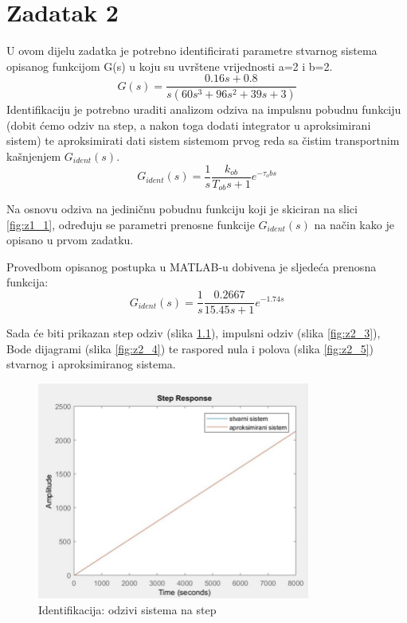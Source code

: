\chapter{Zadatak 2}

U ovom dijelu zadatka je potrebno identificirati parametre stvarnog sistema opisanog funkcijom G(s) u koju su uvrštene vrijednosti a=2 i b=2.
	\[G(s)=\frac{0.16s+0.8}{s(60s^3+96s^2+39s+3)}\]
Identifikaciju je potrebno uraditi analizom odziva na impulsnu pobudnu funkciju (dobit ćemo odziv na step, a nakon toga dodati integrator u aproksimirani sistem) te aproksimirati dati sistem sistemom prvog reda sa čistim transportnim kašnjenjem $G_{ident} (s)$.
	\[G_{ident} (s)=\frac{1}{s}  \frac{k_{ob}}{T_{ob} s+1} e^{-\tau_ob s}\]
 

Na osnovu odziva na jediničnu pobudnu funkciju koji je skiciran na slici \ref{fig:z1_1}, određuju se parametri prenosne funkcije $G_{ident} (s)$ na način kako je opisano u prvom zadatku. 

Provedbom opisanog postupka u MATLAB-u dobivena je sljedeća prenosna funkcija:
	\[G_{ident} (s)=\frac{1}{s}  \frac{0.2667}{15.45s+1} e^{-1.74s}\]

Sada će biti prikazan step odziv (slika \ref{fig:z2_2}), impulsni odziv (slika \ref{fig:z2_3}), Bode dijagrami (slika \ref{fig:z2_4}) te raspored nula i polova (slika \ref{fig:z2_5}) stvarnog i aproksimiranog sistema.

\begin{figure} [H]
  \centering
  \includegraphics[width=0.8\textwidth]{z2_2}
  \caption{Identifikacija: odzivi sistema na step}
  \label{fig:z2_2}
\end{figure}

